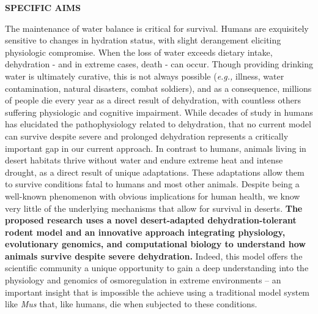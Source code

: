 %
%
%
%
%

\noindent \textbf{SPECIFIC AIMS}

The maintenance of water balance is critical for survival. Humans are exquisitely sensitive to changes in hydration status, with slight derangement eliciting physiologic compromise. When the loss of water exceeds dietary intake, dehydration - and in extreme cases, death - can occur. Though providing drinking water is ultimately curative, this is not always possible (\textit{e.g.,} illness, water contamination, natural disasters, combat soldiers), and as a consequence, millions of people die every year as a direct result of dehydration, with countless others suffering physiologic and cognitive impairment. While decades of study in humans has elucidated the pathophysiology related to dehydration, that no current model can survive despite severe and prolonged dehydration represents a critically important gap in our current approach. In contrast to humans, animals living in desert habitats thrive without water and endure extreme heat and intense drought, as a direct result of unique adaptations. These adaptations allow them to survive conditions fatal to humans and most other animals. Despite being a well-known phenomenon with obvious implications for human health, we know very little of the underlying mechanisms that allow for survival in deserts. \textbf{The proposed research uses a novel desert-adapted dehydration-tolerant rodent model and an innovative approach integrating physiology, evolutionary genomics, and computational biology to understand how animals survive despite severe dehydration.} Indeed, this model offers the scientific community a unique opportunity to gain a deep understanding into the physiology and genomics of osmoregulation in extreme environments – an important insight that is impossible the achieve using a traditional model system like \textit{Mus} that, like humans, die when subjected to these conditions.

